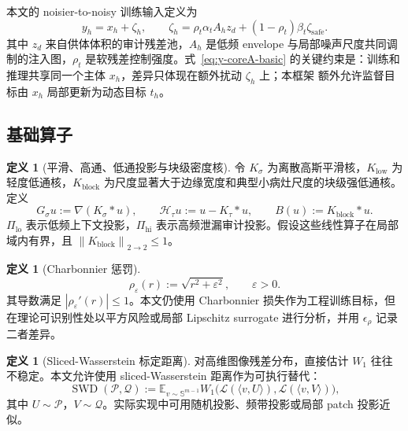 \documentclass[11pt,a4paper,UTF8,fontset=fandol]{ctexart}
\theoremstyle{definition}
\newtheorem{definition}[theorem]{定义}
\DeclareMathOperator{\SWD}{SWD}
\newcommand{\norm}[1]{\left\lVert#1\right\rVert}
\newcommand{\abs}[1]{\left\lvert#1\right\rvert}
\newcommand{\E}{\mathbb{E}}
\newcommand{\cH}{\mathcal{H}}
\begin{document}
本文的 noisier-to-noisy 训练输入定义为
\begin{equation}
\label{eq:y-coreA-basic}
    y_h=x_h+\zeta_h,
    \qquad
    \zeta_h=\rho_t\alpha_tA_hz_d+(1-\rho_t)\beta_t\zeta_{\mathrm{safe}}.
\end{equation}
其中 $z_d$ 来自供体体积的审计残差池，$A_h$ 是低频 envelope 与局部噪声尺度共同调制的注入图，$\rho_t$ 是软残差控制强度。式~\eqref{eq:y-coreA-basic} 的关键约束是：训练和推理共享同一个主体 $x_h$，差异只体现在额外扰动 $\zeta_h$ 上；本框架 额外允许监督目标由 $x_h$ 局部更新为动态目标 $t_h$。

\subsection{基础算子}

\begin{definition}[平滑、高通、低通投影与块级密度核]
令 $K_\sigma$ 为离散高斯平滑核，$K_{\mathrm{low}}$ 为轻度低通核，$K_{\mathrm{block}}$ 为尺度显著大于边缘宽度和典型小病灶尺度的块级强低通核。定义
\begin{equation}
    G_\sigma u:=\nabla(K_\sigma*u),
    \qquad
    \cH_\tau u:=u-K_\tau*u,
    \qquad
    B(u):=K_{\mathrm{block}}*u.
\end{equation}
$\Pi_{\mathrm{lo}}$ 表示低频上下文投影，$\Pi_{\mathrm{hi}}$ 表示高频泄漏审计投影。假设这些线性算子在局部域内有界，且 $\norm{K_{\mathrm{block}}}_{2\to2}\le1$。
\end{definition}

\begin{definition}[Charbonnier 惩罚]
\begin{equation}
    \rho_\varepsilon(r):=\sqrt{r^2+\varepsilon^2},
    \qquad
    \varepsilon>0.
\end{equation}
其导数满足 $\abs{\rho_\varepsilon'(r)}\le1$。本文仍使用 Charbonnier 损失作为工程训练目标，但在理论可识别性处以平方风险或局部 Lipschitz surrogate 进行分析，并用 $\epsilon_\rho$ 记录二者差异。
\end{definition}

\begin{definition}[Sliced-Wasserstein 标定距离]
对高维图像残差分布，直接估计 $W_1$ 往往不稳定。本文允许使用 sliced-Wasserstein 距离作为可执行替代：
\begin{equation}
    \SWD(\mathcal P,\mathcal Q)
    :=\E_{v\sim\mathbb S^{m-1}}
    W_1\big(\mathcal L(\langle v,U\rangle),\mathcal L(\langle v,V\rangle)\big),
\end{equation}
其中 $U\sim\mathcal P$，$V\sim\mathcal Q$。实际实现中可用随机投影、频带投影或局部 patch 投影近似。
\end{definition}
\end{document}
